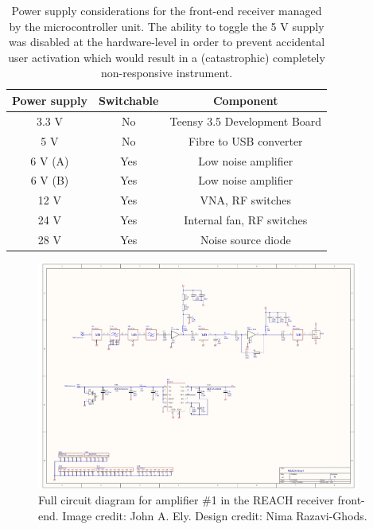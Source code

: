 \begin{table}
    \centering
    \begin{tabular}{ |c|c|c| }
        \hline
        Power supply & Switchable & Component \\
        \hline
        3.3 V & No & Teensy 3.5 Development Board \\
        5 V & No & Fibre to USB converter \\
        6 V (A) & Yes & Low noise amplifier \\
        6 V (B) & Yes & Low noise amplifier \\
        12 V & Yes & VNA, RF switches \\
        24 V & Yes & Internal fan, RF switches \\
        28 V & Yes & Noise source diode \\
        \hline
    \end{tabular}
    \caption{Power supply considerations for the front-end receiver managed by the microcontroller unit. The ability to toggle the 5 V supply was disabled at the hardware-level in order to prevent accidental user activation which would result in a (catastrophic) completely non-responsive instrument.}
    \label{tab:power_supply}
\end{table}

\begin{figure}
    \centering
    \includegraphics[angle=90,width=0.95\textwidth]{amp1_schematic}
    \caption{Full circuit diagram for amplifier \#1 in the REACH receiver front-end. Image credit: John A. Ely. Design credit: Nima Razavi-Ghods.}
    \label{fig:amp1_schematic}
\end{figure}

